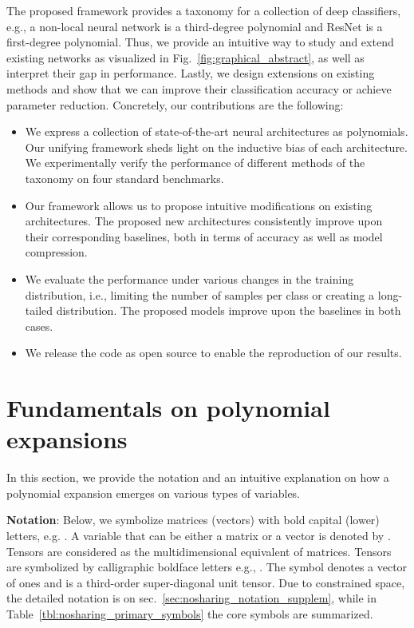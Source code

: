 \documentclass[runningheads]{llncs}
\newcommand{\resnet}{ResNet}
\providecommand\eg{e.g.,}
\begin{document}
The proposed framework provides a taxonomy for a collection of deep classifiers, \eg{} a non-local neural network is a third-degree polynomial and \resnet{} is a first-degree polynomial. 
Thus, we provide an intuitive way to study and extend existing networks as visualized in Fig.~\ref{fig:graphical_abstract}, as well as interpret their gap in performance. Lastly, we design extensions on existing methods and show that we can improve their classification accuracy or achieve parameter reduction. 
Concretely, our contributions are the following:
\begin{itemize}
    \item We express a collection of state-of-the-art neural architectures as polynomials. Our unifying framework sheds light on the inductive bias of each architecture. We experimentally verify the performance of different methods of the taxonomy on four standard benchmarks. 
    \item Our framework allows us to propose intuitive modifications on existing architectures. The proposed new architectures consistently improve upon their corresponding baselines, both in terms of accuracy as well as model compression.  
    \item We evaluate the performance under various changes in the training distribution, i.e., limiting the number of samples per class or creating a long-tailed distribution. The proposed models improve upon the baselines in both cases. 
    \item We release the code as open source to enable the reproduction of our results. 
\end{itemize}


 \section{Fundamentals on polynomial expansions}
\label{sec:nosharing_notation_and_intro_to_polynomials}
In this section, we provide the notation and an intuitive explanation on how a polynomial expansion emerges on various types of variables. 




\noindent\textbf{Notation}: Below, 
we symbolize matrices (vectors) with bold capital (lower) letters, e.g. . A variable that can be either a matrix or a vector is denoted by . Tensors are considered as the multidimensional equivalent of matrices. Tensors are symbolized by calligraphic boldface letters e.g., . The symbol  denotes a vector of ones and  is a third-order super-diagonal unit tensor. Due to constrained space, the detailed notation is on sec.~\ref{sec:nosharing_notation_supplem}, while in Table~\ref{tbl:nosharing_primary_symbols} the core symbols are summarized. 
\end{document}
